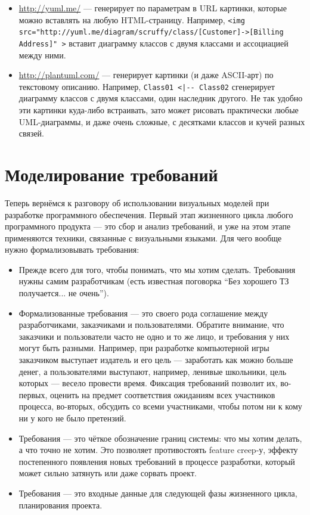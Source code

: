 \documentclass[a5paper]{article}
\begin{document}
\begin{itemize}
\begin{itemize}
        \item \url{http://yuml.me/} --- генерирует по параметрам в URL картинки, которые можно вставлять на любую HTML-страницу. Например, \verb|<img src="http://yuml.me/diagram/scruffy/class/[Customer]->[Billing Address]" >| вставит диаграмму классов с двумя классами и ассоциацией между ними.
        \item \url{http://plantuml.com/} --- генерирует картинки (и даже ASCII-арт) по текстовому описанию. Например, \verb&Class01 <|-- Class02& сгенерирует диаграмму классов с двумя классами, один наследник другого. Не так удобно эти картинки куда-либо встраивать, зато может рисовать практически любые UML-диаграммы, и даже очень сложные, с десятками классов и кучей разных связей.
    \end{itemize}
\end{itemize}

\section{Моделирование требований}

Теперь вернёмся к разговору об использовании визуальных моделей при разработке программного обеспечения. Первый этап жизненного цикла любого программного продукта --- это сбор и анализ требований, и уже на этом этапе применяются техники, связанные с визуальными языками. Для чего вообще нужно формализовывать требования:

\begin{itemize}
    \item Прежде всего для того, чтобы понимать, что мы хотим сделать. Требования нужны самим разработчикам (есть известная поговорка ``Без хорошего ТЗ получается... не очень'').
    \item Формализованные требования --- это своего рода соглашение между разработчиками, заказчиками и пользователями. Обратите внимание, что заказчики и пользователи часто не одно и то же лицо, и требования у них могут быть разными. Например, при разработке компьютерной игры заказчиком выступает издатель и его цель --- заработать как можно больше денег, а пользователями выступают, например, ленивые школьники, цель которых --- весело провести время. Фиксация требований позволит их, во-первых, оценить на предмет соответствия ожиданиям всех участников процесса, во-вторых, обсудить со всеми участниками, чтобы потом ни к кому ни у кого не было претензий.
    \item Требования --- это чёткое обозначение границ системы: что мы хотим делать, а что точно не хотим. Это позволяет противостоять feature creep-у, эффекту постепенного появления новых требований в процессе разработки, который может сильно затянуть или даже сорвать проект.
    \item Требования --- это входные данные для следующей фазы жизненного цикла, планирования проекта.
\end{itemize}
\end{document}
